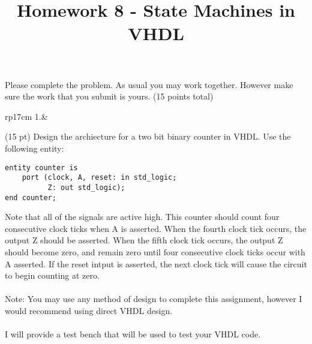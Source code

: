 \documentclass{article}
\title{Homework 8 - State Machines in VHDL}
\date{}
\begin{document}
\maketitle
Please complete the problem.  As usual you may work together.  However make sure the work that you submit is yours. (15 points total)
\begin{longtable}[l]{rp{17cm}}
1.&\begin{minipage}[t]{\linewidth}(15 pt) Design the archiecture for a two bit binary counter in VHDL.  Use the following entity:
\lstset{language=VHDL}
\begin{lstlisting}
entity counter is
    port (clock, A, reset: in std_logic;
          Z: out std_logic);
end counter;
\end{lstlisting}
Note that all of the signals are active high.  This counter should count four consecutive clock ticks when A is asserted.  When the fourth clock tick occurs, the output Z should be asserted.  When the fifth clock tick occurs, the output Z should become zero, and remain zero until four consecutive clock ticks occur with A asserted.  If the reset intput is asserted, the next clock tick will cause the circuit to begin counting at zero.\\ \\
Note: You may use any method of design to complete this assignment, however I would recommend using direct VHDL design.\\ \\
I will provide a test bench that will be used to test your VHDL code.

\vspace{8cm
}
\end{minipage}\\
\medskip
\end{longtable}
\end{document}
